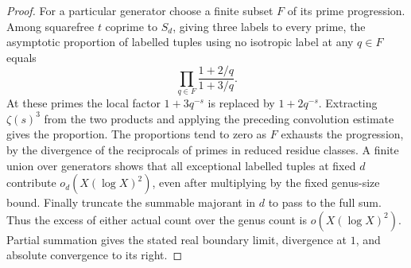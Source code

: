 \begin{proof}
For a particular generator choose a finite subset $F$ of its prime progression. Among squarefree $t$ coprime to $S_d$, giving three labels to every prime, the asymptotic proportion of labelled tuples using no isotropic label at any $q\in F$ equals
\[
 \prod_{q\in F}\frac{1+2/q}{1+3/q}.
\]
At these primes the local factor $1+3q^{-s}$ is replaced by
$1+2q^{-s}$. Extracting $\zeta(s)^3$ from the two products and
applying the preceding convolution estimate gives the proportion. The proportions tend to zero as $F$ exhausts the progression, by the divergence of the reciprocals of primes in reduced residue classes. A finite union over generators shows that all exceptional labelled tuples at fixed $d$ contribute $o_d(X(\log X)^2)$, even after multiplying by the fixed genus-size bound. Finally truncate the summable majorant in $d$ to pass to the full sum. Thus the excess of either actual count over the genus count is $o(X(\log X)^2)$. Partial summation gives the stated real boundary limit, divergence at $1$, and absolute convergence to its right.
\end{proof}

